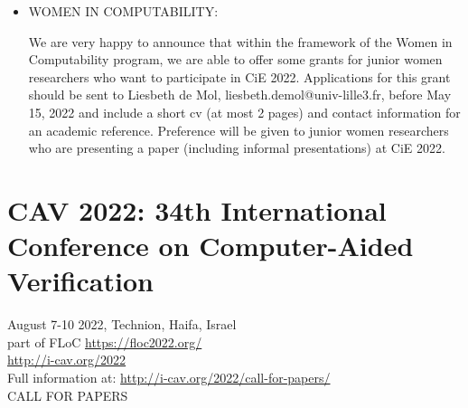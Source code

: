 \documentclass[prodmode,acmtecs]{acmsmall} %
\begin{document}
\begin{itemize}
\item  WOMEN IN COMPUTABILITY: 
 
  We are very happy to announce that within the framework of the Women in Computability program, we are able to offer some grants for junior women researchers who want to participate in CiE 2022. Applications for this grant should be sent to Liesbeth de Mol, liesbeth.demol@univ-lille3.fr, before May 15, 2022 and include a short cv (at most 2 pages) and contact information for an academic reference. Preference will be given to junior women researchers who are presenting a paper (including informal presentations) at CiE 2022. 
 
\end{itemize}\section{CAV 2022: 34th International Conference on Computer-Aided Verification}\label{CAV2022}  August 7-10 2022, Technion, Haifa, Israel\\ 
  part of FLoC \href{https://floc2022.org/}{https://floc2022.org/}\\ 
  \href{http://i-cav.org/2022}{http://i-cav.org/2022}\\ 
  Full information at: \href{http://i-cav.org/2022/call-for-papers/}{http://i-cav.org/2022/call-for-papers/}\\ 
CALL FOR PAPERS 
\end{document}
